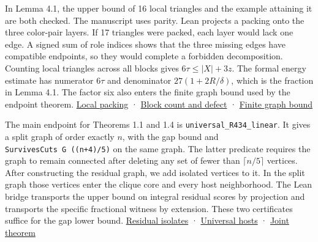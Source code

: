 \documentclass[english,11pt,a4paper]{article}
\begin{document}
In Lemma 4.1, the upper bound of 16 local triangles and the example attaining it are both checked. The manuscript uses parity. Lean projects a packing onto the three color-pair layers. If 17 triangles were packed, each layer would lack one edge. A signed sum of role indices shows that the three missing edges have compatible endpoints, so they would complete a forbidden decomposition. Counting local triangles across all blocks gives \(6\tau\le |X|+3z\). The formal energy estimate has numerator \(6\tau\) and denominator \(27(1+2R/\delta)\), which is the fraction in Lemma 4.1. The factor six also enters the finite graph bound used by the endpoint theorem. \href{https://github.com/jtraverso/split-clique-partition-gap/blob/ccb5444b2ecdff9de1d6221133633a25a224953d/R434/LocalPacking.lean}{Local packing} · \href{https://github.com/jtraverso/split-clique-partition-gap/blob/ccb5444b2ecdff9de1d6221133633a25a224953d/R434/CoreDefect.lean}{Block count and defect} · \href{https://github.com/jtraverso/split-clique-partition-gap/blob/ccb5444b2ecdff9de1d6221133633a25a224953d/R434/FiniteR434.lean}{Finite graph bound}

The main endpoint for Theorems 1.1 and 1.4 is \texttt{universal\_R434\_linear}. It gives a split graph of order exactly \(n\), with the gap bound and \texttt{SurvivesCuts\ G\ ((n+4)/5)} on the same graph. The latter predicate requires the graph to remain connected after deleting any set of fewer than \(\lceil n/5\rceil\) vertices. After constructing the residual graph, we add isolated vertices to it. In the split graph those vertices enter the clique core and every host neighborhood. The Lean bridge transports the upper bound on integral residual scores by projection and transports the specific fractional witness by extension. These two certificates suffice for the gap lower bound. \href{https://github.com/jtraverso/split-clique-partition-gap/blob/ccb5444b2ecdff9de1d6221133633a25a224953d/R434/ResidualIsolates.lean}{Residual isolates} · \href{https://github.com/jtraverso/split-clique-partition-gap/blob/ccb5444b2ecdff9de1d6221133633a25a224953d/R434/UniversalHosts.lean}{Universal hosts} · \href{https://github.com/jtraverso/split-clique-partition-gap/blob/ccb5444b2ecdff9de1d6221133633a25a224953d/R434/PolylogGap.lean}{Joint theorem}
\end{document}

